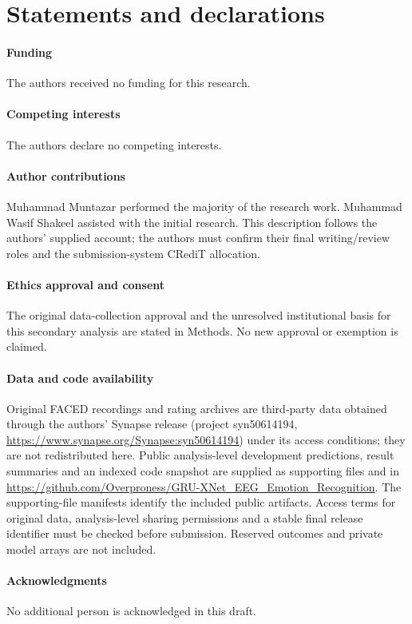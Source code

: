 \documentclass[12pt,a4paper]{article}
\begin{document}
\section*{Statements and declarations}
\paragraph{Funding} The authors received no funding for this research.
\paragraph{Competing interests} The authors declare no competing interests.
\paragraph{Author contributions} Muhammad Muntazar performed the majority of the research work. Muhammad Wasif Shakeel assisted with the initial research. This description follows the authors' supplied account; the authors must confirm their final writing/review roles and the submission-system CRediT allocation.
\paragraph{Ethics approval and consent} The original data-collection approval and the unresolved institutional basis for this secondary analysis are stated in Methods. No new approval or exemption is claimed.
\paragraph{Data and code availability} Original FACED recordings and rating archives are third-party data obtained through the authors' Synapse release (project syn50614194, \url{https://www.synapse.org/Synapse:syn50614194}) under its access conditions; they are not redistributed here. Public analysis-level development predictions, result summaries and an indexed code snapshot are supplied as supporting files and in \url{https://github.com/Overproness/GRU-XNet_EEG_Emotion_Recognition}. The supporting-file manifests identify the included public artifacts. Access terms for original data, analysis-level sharing permissions and a stable final release identifier must be checked before submission. Reserved outcomes and private model arrays are not included.
\paragraph{Acknowledgments} No additional person is acknowledged in this draft.
\end{document}
